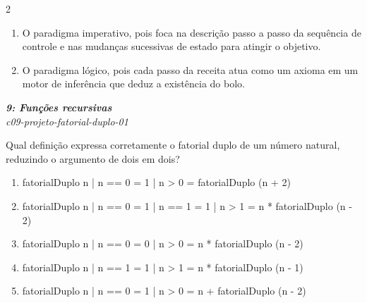 \documentclass[a4paper,10pt,brazil]{article}
\begin{document}
\begin{multicols}{2}
\begin{enumerate}
  \item O paradigma imperativo, pois foca na descrição passo a passo da sequência de controle e nas mudanças sucessivas de estado para atingir o objetivo.

  \item O paradigma lógico, pois cada passo da receita atua como um axioma em um motor de inferência que deduz a existência do bolo.


\end{enumerate}

\begin{flushright}
  \footnotesize
  \textit{\textbf{9: Funções recursivas}}\\
  \textit{c09-projeto-fatorial-duplo-01}\\

\end{flushright}
Qual definição expressa corretamente o fatorial duplo de um número natural, reduzindo o argumento de dois em dois?

\begin{enumerate}
  \item \begin{haskellcode}
fatorialDuplo n
  | n == 0 = 1
  | n > 0  = fatorialDuplo (n + 2)
\end{haskellcode}

  \item \begin{haskellcode}
fatorialDuplo n
  | n == 0 = 1
  | n == 1 = 1
  | n > 1  = n * fatorialDuplo (n - 2)
\end{haskellcode}

  \item \begin{haskellcode}
fatorialDuplo n
  | n == 0 = 0
  | n > 0  = n * fatorialDuplo (n - 2)
\end{haskellcode}

  \item \begin{haskellcode}
fatorialDuplo n
  | n == 1 = 1
  | n > 1  = n * fatorialDuplo (n - 1)
\end{haskellcode}

  \item \begin{haskellcode}
fatorialDuplo n
  | n == 0 = 1
  | n > 0  = n + fatorialDuplo (n - 2)
\end{haskellcode}


\end{enumerate}


\end{multicols}
\end{document}
